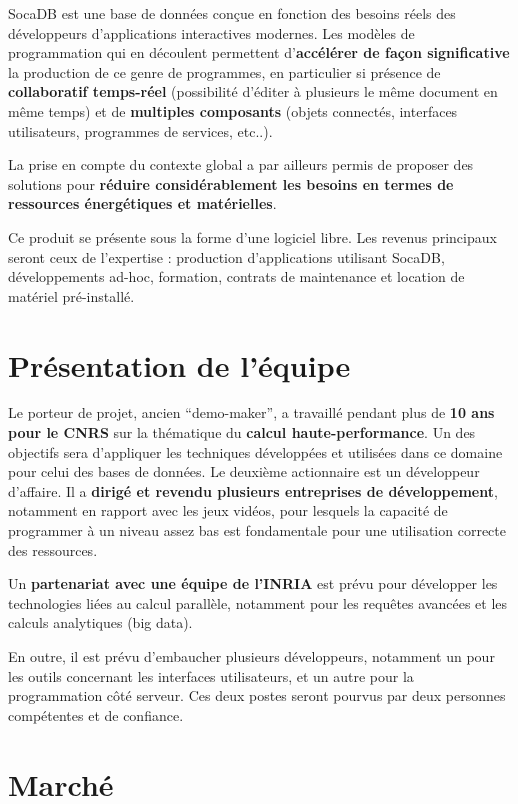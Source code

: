 \documentclass[a4paper,10pt]{scrreprt}
\begin{document}
        SocaDB est une base de données conçue en fonction des besoins réels des développeurs d'applications interactives modernes. Les modèles de programmation qui en découlent permettent d'\textbf{accélérer de façon significative} la production de ce genre de programmes, en particulier si présence de \textbf{collaboratif temps-réel} (possibilité d'éditer à plusieurs le même document en même temps) et de \textbf{multiples composants} (objets connectés, interfaces utilisateurs, programmes de services, etc..).
    
        La prise en compte du contexte global a par ailleurs permis de proposer des solutions pour \textbf{réduire considérablement les besoins en termes de ressources énergétiques et matérielles}.
    
        \medskip
        Ce produit se présente sous la forme d'une logiciel libre. Les revenus principaux seront ceux de l'expertise : production d'applications utilisant SocaDB, développements ad-hoc, formation, contrats de maintenance et location de matériel pré-installé.
    
    \section*{Présentation de l'équipe}

        Le porteur de projet, ancien ``demo-maker'', a travaillé pendant plus de \textbf{10 ans pour le CNRS} sur la thématique du \textbf{calcul haute-performance}. Un des objectifs sera d'appliquer les techniques développées et utilisées dans ce domaine pour celui des bases de données. Le deuxième actionnaire est un développeur d'affaire. Il a \textbf{dirigé et revendu plusieurs entreprises de développement}, notamment en rapport avec les jeux vidéos, pour lesquels la capacité de programmer à un niveau assez bas est fondamentale pour une utilisation correcte des ressources.
    
        Un \textbf{partenariat avec une équipe de l'INRIA} est prévu pour développer les technologies liées au calcul parallèle, notamment pour les requêtes avancées et les calculs analytiques (big data).
        
        En outre, il est prévu d'embaucher plusieurs développeurs, notamment un pour les outils concernant les interfaces utilisateurs, et un autre pour la programmation côté serveur. Ces deux postes seront pourvus par deux personnes compétentes et de confiance.
    
    \section*{Marché} %
    
\end{document}
